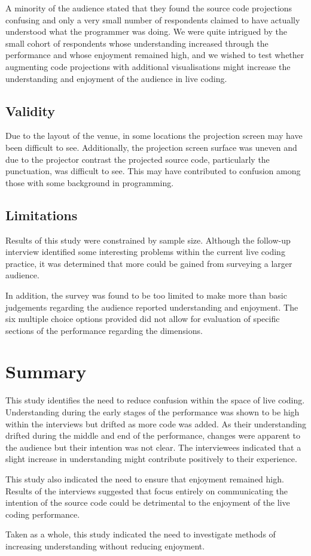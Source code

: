 A minority of the audience stated that they found the source code projections confusing and only a very small number of respondents claimed to have actually understood what the programmer was doing. We were quite intrigued by the small cohort of respondents whose understanding increased through the performance and whose enjoyment remained high, and we wished to test whether augmenting code projections with additional visualisations might increase the understanding and enjoyment of the audience in live coding. \fix

\subsection{Validity}

Due to the layout of the venue, in some locations the projection screen may have been difficult to see. Additionally, the projection screen surface was uneven and due to the projector contrast the projected source code, particularly the punctuation, was difficult to see. This may have contributed to confusion among those with some background in programming.

\more

\subsection{Limitations}

Results of this study were constrained by sample size. Although the follow-up interview identified some interesting problems within the current live coding practice, it was determined that more could be gained from surveying a larger audience.

In addition, the survey was found to be too limited to make more than basic judgements regarding the audience reported understanding and enjoyment. The six multiple choice options provided did not allow for evaluation of specific sections of the performance regarding the dimensions.

\section{Summary}

This study identifies the need to reduce confusion within the space of live coding. Understanding during the early stages of the performance was shown to be high within the interviews but drifted as more code was added. As their understanding drifted during the middle and end of the performance, changes were apparent to the audience but their intention was not clear. The interviewees indicated that a slight increase in understanding might contribute positively to their experience.

This study also indicated the need to ensure that enjoyment remained high. Results of the interviews suggested that focus entirely on communicating the intention of the source code could be detrimental to the enjoyment of the live coding performance.

Taken as a whole, this study indicated the need to investigate methods of increasing understanding without reducing enjoyment.

